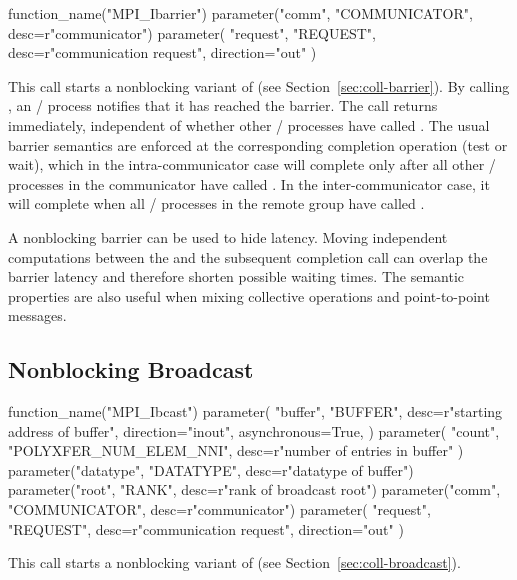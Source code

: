 \begin{mpi-binding}
    function_name("MPI_Ibarrier")
    parameter("comm", "COMMUNICATOR", desc=r"communicator")
    parameter(
        "request", "REQUEST", desc=r"communication request", direction="out"
    )
\end{mpi-binding}

This call starts a nonblocking variant of
 (see Section~\ref{sec:coll-barrier}).
By calling , an \MPI/ process
notifies that it has reached the barrier. The call returns immediately,
independent of whether other \MPI/ processes have called .
The usual barrier semantics are enforced at the corresponding completion
operation (test or wait), which in the intra-communicator case will
complete only after all other \MPI/ processes in the communicator have called
. In the inter-communicator case, it will complete
when all \MPI/ processes in the remote group have called
.

\begin{users}
A nonblocking barrier can be used to hide latency. Moving
independent computations between the  and the
subsequent completion call can overlap the barrier latency and therefore
shorten possible waiting times. The semantic properties are also useful
when mixing collective operations and point-to-point messages.
\end{users}


\subsection{Nonblocking Broadcast}
\label{sec:nbcoll-ibroadcast}

\begin{mpi-binding}
    function_name("MPI_Ibcast")
    parameter(
        "buffer",
        "BUFFER",
        desc=r"starting address of buffer",
        direction="inout",
        asynchronous=True,
    )
    parameter(
        "count", "POLYXFER_NUM_ELEM_NNI", desc=r"number of entries in buffer"
    )
    parameter("datatype", "DATATYPE", desc=r"datatype of buffer")
    parameter("root", "RANK", desc=r"rank of broadcast root")
    parameter("comm", "COMMUNICATOR", desc=r"communicator")
    parameter(
        "request", "REQUEST", desc=r"communication request", direction="out"
    )
\end{mpi-binding}

This call starts a nonblocking variant of  (see
Section~\ref{sec:coll-broadcast}).

